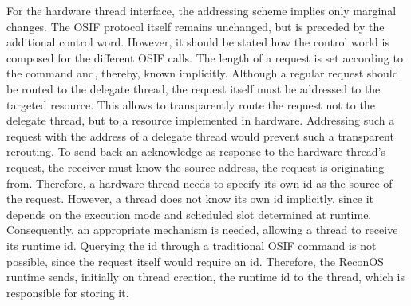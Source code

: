 For the hardware thread interface, the addressing scheme implies only marginal
changes. The \ac{OSIF} protocol itself remains unchanged, but is preceded by
the additional control word. However, it should be stated how the control
world is composed for the different \ac{OSIF} calls. The length of a request
is set according to the command and, thereby, known implicitly. Although a
regular request should be routed to the delegate thread, the request itself
must be addressed to the targeted resource. This allows to transparently route
the request not to the delegate thread, but to a resource implemented in
hardware. Addressing such a request with the address of a delegate thread
would prevent such a transparent rerouting. To send back an acknowledge as
response to the hardware thread's request, the receiver must know the source
address, the request is originating from. Therefore, a hardware thread needs
to specify its own id as the source of the request. However, a thread does not
know its own id implicitly, since it depends on the execution mode and
scheduled slot determined at runtime. Consequently, an appropriate mechanism
is needed, allowing a thread to receive its runtime id. Querying the id
through a traditional \ac{OSIF} command is not possible, since the request
itself would require an id. Therefore, the ReconOS runtime sends, initially on
thread creation, the runtime id to the thread, which is responsible for
storing it.

